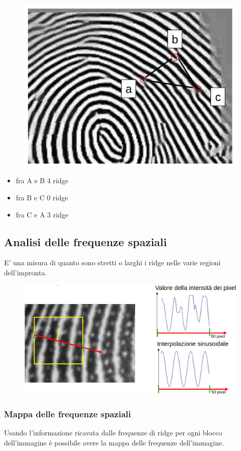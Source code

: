 \begin{figure}[ht]
    \centering
    \includegraphics[width=0.5\linewidth]{chapters/images-chap6/ridge-counting.png}
\end{figure}

\begin{itemize}
    \item fra A e B 4 ridge
    \item fra B e C 0 ridge
    \item fra C e A 3 ridge
\end{itemize}

\subsection{Analisi delle frequenze spaziali}

E’ una misura di quanto sono stretti o larghi i
ridge nelle varie regioni dell’impronta.

\begin{figure}[ht]
    \centering
    \includegraphics[width=1\linewidth]{chapters/images-chap6/ridge-freq.png}
\end{figure}

\subsubsection{Mappa delle frequenze spaziali}

Usando l’informazione ricavata dalle frequenze di
ridge per ogni blocco dell’immagine è possibile
avere la mappa delle frequenze dell’immagine.



